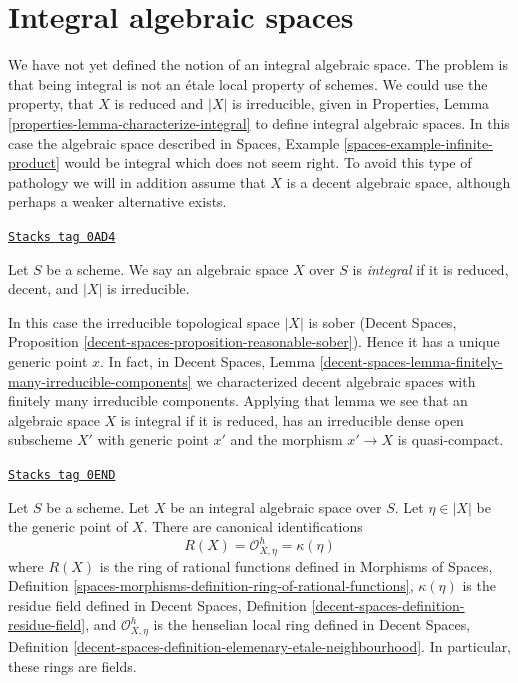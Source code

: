 \section{Integral algebraic spaces}
\label{spaces-over-fields-section-integral-spaces}
We have not yet defined the notion of an integral algebraic space. The
problem is that being integral is not an \'etale local property of schemes.
We could use the property, that $X$ is reduced and $|X|$ is irreducible,
given in Properties, Lemma \ref{properties-lemma-characterize-integral}
to define integral algebraic spaces. In this case the algebraic
space described in Spaces, Example \ref{spaces-example-infinite-product}
would be integral which does not seem right.
To avoid this type of pathology we will in addition assume that $X$ is a
decent algebraic space, although perhaps a weaker alternative exists.

\begin{definition}
\label{spaces-over-fields-definition-integral-algebraic-space}
\href{https://stacks.math.columbia.edu/tag/0AD4}{\texttt{Stacks tag 0AD4}}

Let $S$ be a scheme. We say an algebraic space $X$ over $S$ is
{\it integral} if it is reduced, decent, and $|X|$ is irreducible.
\end{definition}

In this case the irreducible topological space $|X|$ is sober
(Decent Spaces, Proposition \ref{decent-spaces-proposition-reasonable-sober}).
Hence it has a unique generic point $x$. In fact, in
Decent Spaces, Lemma
\ref{decent-spaces-lemma-finitely-many-irreducible-components}
we characterized decent algebraic spaces with finitely many
irreducible components. Applying that lemma we see that an
algebraic space $X$ is integral if it is
reduced, has an irreducible dense open subscheme $X'$
with generic point $x'$ and the morphism $x' \to X$ is quasi-compact.

\begin{lemma}
\label{spaces-over-fields-lemma-integral-algebraic-space-rational-functions}
\href{https://stacks.math.columbia.edu/tag/0END}{\texttt{Stacks tag 0END}}

Let $S$ be a scheme. Let $X$ be an integral algebraic space over $S$.
Let $\eta \in |X|$ be the generic point of $X$.
There are canonical identifications
$$
R(X) = \mathcal{O}_{X, \eta}^h = \kappa(\eta)
$$
where $R(X)$ is the ring of rational functions defined in
Morphisms of Spaces, Definition
\ref{spaces-morphisms-definition-ring-of-rational-functions},
$\kappa(\eta)$ is the residue field defined in
Decent Spaces, Definition \ref{decent-spaces-definition-residue-field},
and $\mathcal{O}_{X, \eta}^h$ is the henselian local ring defined in
Decent Spaces, Definition
\ref{decent-spaces-definition-elemenary-etale-neighbourhood}.
In particular, these rings are fields.
\end{lemma}

